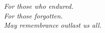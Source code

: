 \documentclass[../1_thesis]{subfiles}
\begin{document}

\begin{dedication}
\textit{For those who endured.} \\ [1em]
\textit{For those forgotten.} \\ [1em]
\textit{May remembrance outlast us all.}
\end{dedication}
\end{document}
